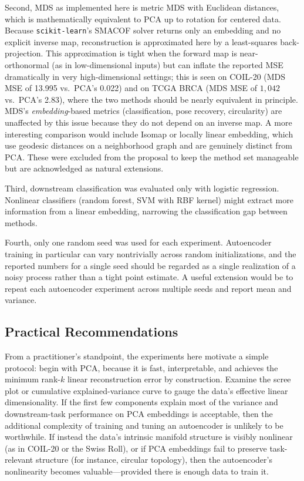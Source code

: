 \documentclass[11pt]{article}
\begin{document}
Second, MDS as implemented here is metric MDS with Euclidean distances, which is mathematically equivalent to PCA up to rotation for centered data. Because \texttt{scikit-learn}'s SMACOF solver returns only an embedding and no explicit inverse map, reconstruction is approximated here by a least-squares back-projection. This approximation is tight when the forward map is near-orthonormal (as in low-dimensional inputs) but can inflate the reported MSE dramatically in very high-dimensional settings; this is seen on COIL-20 (MDS MSE of 13.995 vs.\ PCA's 0.022) and on TCGA BRCA (MDS MSE of $1{,}042$ vs.\ PCA's 2.83), where the two methods should be nearly equivalent in principle. MDS's \emph{embedding}-based metrics (classification, pose recovery, circularity) are unaffected by this issue because they do not depend on an inverse map. A more interesting comparison would include Isomap or locally linear embedding, which use geodesic distances on a neighborhood graph and are genuinely distinct from PCA. These were excluded from the proposal to keep the method set manageable but are acknowledged as natural extensions.

Third, downstream classification was evaluated only with logistic regression. Nonlinear classifiers (random forest, SVM with RBF kernel) might extract more information from a linear embedding, narrowing the classification gap between methods.

Fourth, only one random seed was used for each experiment. Autoencoder training in particular can vary nontrivially across random initializations, and the reported numbers for a single seed should be regarded as a single realization of a noisy process rather than a tight point estimate. A useful extension would be to repeat each autoencoder experiment across multiple seeds and report mean and variance.

\subsection{Practical Recommendations}

From a practitioner's standpoint, the experiments here motivate a simple protocol: begin with PCA, because it is fast, interpretable, and achieves the minimum rank-$k$ linear reconstruction error by construction. Examine the scree plot or cumulative explained-variance curve to gauge the data's effective linear dimensionality. If the first few components explain most of the variance and downstream-task performance on PCA embeddings is acceptable, then the additional complexity of training and tuning an autoencoder is unlikely to be worthwhile. If instead the data's intrinsic manifold structure is visibly nonlinear (as in COIL-20 or the Swiss Roll), or if PCA embeddings fail to preserve task-relevant structure (for instance, circular topology), then the autoencoder's nonlinearity becomes valuable---provided there is enough data to train it.
\end{document}

